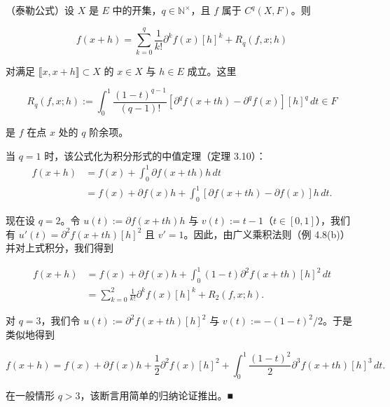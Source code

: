\begin{theorem}

（泰勒公式）设 $ X $ 是 $ E $ 中的开集，$ q \in \mathbb{N}^{\times} $，且 $ f $ 属于 $ C^{q}(X, F) $。则

\[
f(x + h) = \sum_{k=0}^{q}\frac{1}{k!}\partial^{k}f(x)[h]^{k} + R_{q}(f, x; h)
\]

对满足 $ \llbracket x, x + h \rrbracket \subset X $ 的 $ x \in X $ 与 $ h \in E $ 成立。这里

\[
R_{q}(f, x; h) := \int_{0}^{1}\frac{(1 - t)^{q-1}}{(q - 1)!}\left[ \partial^{q}f(x + th) - \partial^{q}f(x) \right][h]^{q}\, dt \in F
\]

是 $ f $ 在点 $ x $ 处的 $ q $ 阶余项。

\proofhead
当 $ q = 1 $ 时，该公式化为积分形式的中值定理（定理 3.10）：
\begin{equation*}
\begin{aligned}
f(x + h) &= f(x) + \int_{0}^{1}\partial f(x + th)h\, dt \\ &= f(x) + \partial f(x)h + \int_{0}^{1}\left[ \partial f(x + th) - \partial f(x) \right]h\, dt .
\end{aligned}
\end{equation*}

现在设 $ q = 2 $。令 $ u(t) := \partial f(x + th)h $ 与 $ v(t) := t - 1 $（$ t \in [0, 1] $），我们有 $ u'(t) = \partial^{2}f(x + th)[h]^{2} $ 且 $ v' = 1 $。因此，由广义乘积法则（例 4.8(b)）并对上式积分，我们得到

\begin{equation*}
\begin{aligned}
f(x + h) &= f(x) + \partial f(x)h + \int_{0}^{1}(1 - t)\partial^{2}f(x + th)[h]^{2}\, dt \\ &= \sum_{k=0}^{2}\frac{1}{k!}\partial^{k}f(x)[h]^{k} + R_{2}(f, x; h) .
\end{aligned}
\end{equation*}

对 $ q = 3 $，我们令 $ u(t) := \partial^{2}f(x + th)[h]^{2} $ 与 $ v(t) := -(1 - t)^{2}/2 $。于是类似地得到

\[
f(x + h) = f(x) + \partial f(x)h + \frac{1}{2}\partial^{2}f(x)[h]^{2} + \int_{0}^{1}\frac{(1 - t)^{2}}{2}\partial^{3}f(x + th)[h]^{3}\, dt .
\]

在一般情形 $ q > 3 $，该断言用简单的归纳论证推出。\nobreak\hspace{0.35em}■

\end{theorem}

